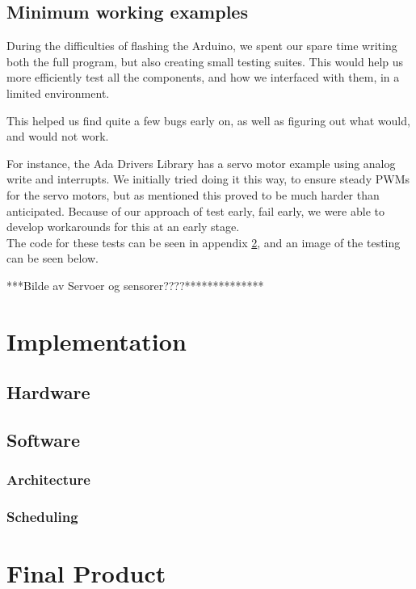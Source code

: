 \documentclass{article}
\begin{document}
\subsection{Minimum working examples}

During the difficulties of flashing the Arduino, we spent our spare time writing both the full program, but also creating small testing suites. This would help us more efficiently test all the components, and how we interfaced with them, in a limited environment. 

This helped us find quite a few bugs early on, as well as figuring out what would, and would not work.

For instance, the Ada Drivers Library has a servo motor example using analog write and interrupts. We initially tried doing it this way, to ensure steady PWMs for the servo motors, but as mentioned this proved to be much harder than anticipated. Because of our approach of test early, fail early, we were able to develop workarounds for this at an early stage.\\ 

The code for these tests can be seen in appendix \ref{}, and an image of the testing can be seen below. 

***Bilde av Servoer og sensorer????**************

\section{Implementation}

\subsection{Hardware}

\subsection{Software}

\subsubsection{Architecture}

\subsubsection{Scheduling}


\section{Final Product}
\end{document}
